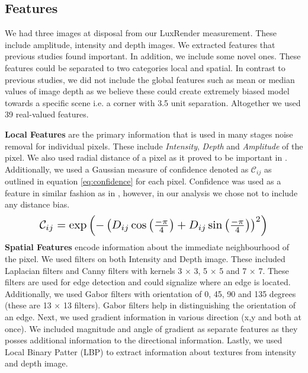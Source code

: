 \documentclass[11pt,twocolumn]{article}
\begin{document}
\subsection{Features}
We had three images at disposal from our LuxRender measurement. These include amplitude, intensity and depth images. We extracted features that previous studies \cite{Reynolds2011,Song2014} found important. In addition, we include some novel ones. These features could be separated to two categories local and spatial. In contrast to previous studies, we did not include the global features such as mean or median values of image depth as we believe these could create extremely biased model towards a specific scene i.e. a corner with 3.5 unit separation. Altogether we used 39 real-valued features. 

\textbf{Local Features} are the primary information that is used in many stages noise removal for individual pixels. These include \emph{Intensity}, 
\emph{Depth} and \emph{Amplitude} of the pixel. We also used radial distance of a pixel as it proved to be important in \cite{Song2014}. Additionally, we used a Gaussian measure of confidence denoted as $\mathcal{C}_{ij}$ as outlined in equation \eqref{eq:confidence} for each pixel. Confidence was used as a feature in similar fashion as in \cite{Reynolds2011}, however, in our analysis we chose not to include any distance bias. 
\begin{equation}\label{eq:confidence}
\resizebox{.8\hsize}{!}{$\mathcal{C}_{ij}=\exp\left({-\left(D_{ij}\cos\left(\frac{-\pi}{4}\right)+D_{ij}\sin\left(\frac{-\pi}{4}\right)\right)^2}\right)$}
\end{equation}
\textbf{Spatial Features} encode information about the immediate neighbourhood of the pixel. We used filters on both Intensity and Depth image. These included Laplacian filters and Canny filters with kernels 3 $\times$ 3, 5 $\times$ 5 and 7 $\times$ 7. These filters are used for edge detection and could signalize where an edge is located. Additionally, we used Gabor filters with orientation of 0, 45, 90 and 135 degrees (these are 13 $\times$ 13 filters). Gabor filters help in distinguishing the orientation of an edge. Next, we used gradient information in various direction (x,y and both at once). We included magnitude and angle of gradient as separate features as they posses additional information to the directional information. Lastly, we used Local Binary Patter (LBP) to extract information about textures \cite{Ojala1994} from intensity and depth image.
\end{document}

